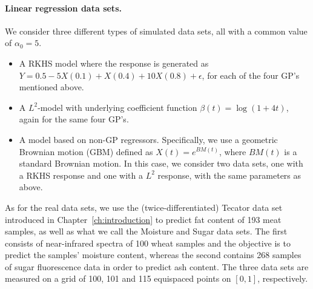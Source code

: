 \paragraph{Linear regression data sets.} We consider three different types of simulated data sets, all with a common value of \(\alpha_0=5\).
\begin{itemize}
  \item A RKHS model where the response is generated as \(Y= 0.5 -5X(0.1) + X(0.4) + 10X(0.8) + \epsilon\), for each of the four GP's mentioned above.
  \item A \(L^2\)-model with underlying coefficient function \(\beta(t)=\log(1+4t)\), again for the same four GP's.
  \item A model based on non-GP regressors. Specifically, we use a geometric Brownian motion (GBM) defined as \(X(t)=e^{BM(t)}\), where \(BM(t)\) is a standard Brownian motion. In this case, we consider two data sets, one with a RKHS response and one with a \(L^2\) response, with the same parameters as above.
\end{itemize}
As for the real data sets, we use the (twice-differentiated) Tecator data set introduced in Chapter~\ref{ch:introduction} to predict fat content of 193 meat samples, as well as what we call the Moisture \citep{kalivas1997two} and Sugar \citep{bro1999exploratory} data sets. The first consists of near-infrared spectra of 100 wheat samples and the objective is to predict the samples' moisture content, whereas the second contains 268 samples of sugar fluorescence data in order to predict ash content. The three data sets are measured on a grid of 100, 101 and 115 equispaced points on \([0, 1]\), respectively.

